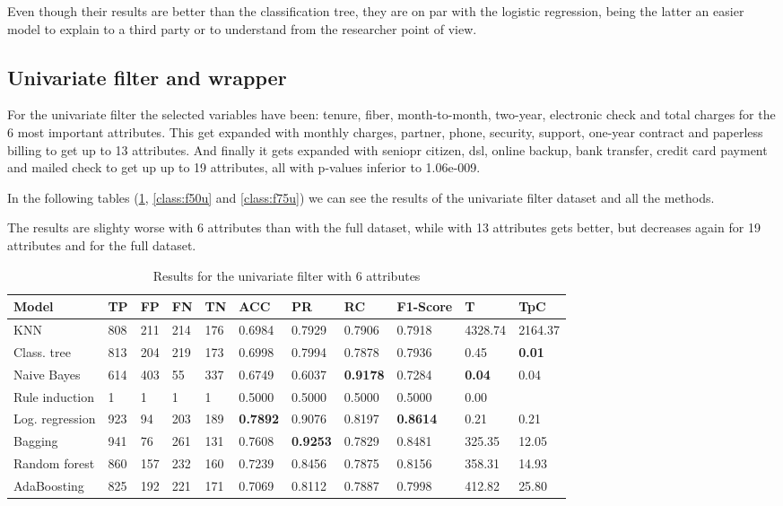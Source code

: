 \documentclass[a4paper,11pt]{article}
\begin{document}
Even though their results are better than the classification tree, they are on par with the logistic regression, being the latter an easier model to explain to a third party or to understand from the researcher point of view.

\subsection{Univariate filter and wrapper}

For the univariate filter the selected variables have been: tenure, fiber, month-to-month, two-year, electronic check and total charges for the 6 most important attributes. This get expanded with monthly charges, partner, phone, security, support, one-year contract and paperless billing to get up to 13 attributes. And finally it gets expanded with seniopr citizen, dsl, online backup, bank transfer, credit card payment and mailed check to get up up to 19 attributes, all with p-values inferior to 1.06e-009.

In the following tables (\ref{class:f25u}, \ref{class:f50u} and \ref{class:f75u}) we can see the results of the univariate filter dataset and all the methods.

The results are slighty worse with 6 attributes than with the full dataset, while with 13 attributes gets better, but decreases again for 19 attributes and for the full dataset.

\begin{table}
\centering
\begin{tabular}{|l|l|l|l|l|l|l|l|l|l|l|}
\hline

\textbf{Model} & \textbf{TP} & \textbf{FP} & \textbf{FN} & \textbf{TN} & \textbf{ACC} & \textbf{PR} & \textbf{RC} & \textbf{F1-Score} & \textbf{T} & \textbf{TpC} \\ \hline
KNN & 808 & 211 & 214 & 176 & 0.6984 & 0.7929 & 0.7906 & 0.7918 & 4328.74 & 2164.37 \\ \hline
Class. tree & 813 & 204 & 219 & 173 & 0.6998 & 0.7994 & 0.7878 & 0.7936 & 0.45 & \textbf{0.01} \\ \hline
Naive Bayes & 614 & 403 & 55 & 337 & 0.6749 & 0.6037 & \textbf{0.9178} & 0.7284 & \textbf{0.04} & 0.04 \\ \hline
Rule induction & 1 & 1 & 1 & 1 & 0.5000 & 0.5000 & 0.5000 & 0.5000 & 0.00 \\ \hline
Log. regression & 923 & 94 & 203 & 189 & \textbf{0.7892} & 0.9076 & 0.8197 & \textbf{0.8614} & 0.21 & 0.21 \\ \hline
Bagging & 941 & 76 & 261 & 131 & 0.7608 & \textbf{0.9253} & 0.7829 & 0.8481 & 325.35 & 12.05 \\ \hline
Random forest & 860 & 157 & 232 & 160 & 0.7239 & 0.8456 & 0.7875 & 0.8156 & 358.31 & 14.93 \\ \hline
AdaBoosting & 825 & 192 & 221 & 171 & 0.7069 & 0.8112 & 0.7887 & 0.7998 & 412.82 & 25.80 \\ \hline

\end{tabular}
\caption{Results for the univariate filter with 6 attributes}
\label{class:f25u}
\end{table}
\end{document}
